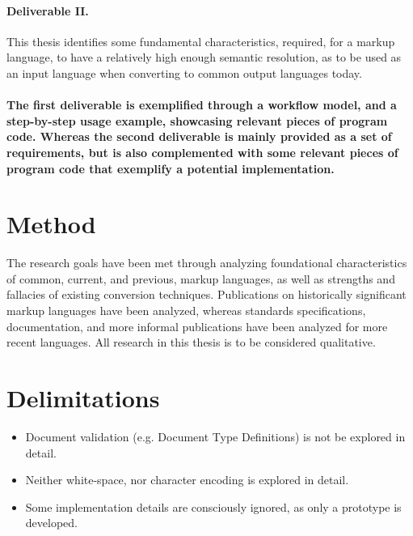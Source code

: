 \documentclass{scrreprt}
\begin{document}
\paragraph{Deliverable II.} This thesis identifies some fundamental characteristics, required, for a markup language, to have a relatively high enough semantic resolution, as to be used as an input language when converting to common output languages today.

\paragraph{The first deliverable is exemplified through a workflow model, and a step-by-step usage example, showcasing relevant pieces of program code. Whereas the second deliverable is mainly provided as a set of requirements, but is also complemented with some relevant pieces of program code that exemplify a potential implementation.}





\section{Method}
The research goals have been met through analyzing foundational characteristics of common, current, and previous, markup languages, as well as strengths and fallacies of existing conversion techniques. Publications on historically significant markup languages have been analyzed, whereas standards specifications, documentation, and more informal publications have been analyzed for more recent languages. All research in this thesis is to be considered qualitative.


\section{Delimitations}
\begin{itemize}
\item Document validation (e.g. Document Type Definitions) is not be explored in detail.
\item Neither white-space, nor character encoding is explored in detail.
\item Some implementation details are consciously ignored, as only a prototype is developed.
\end{itemize}
\end{document}
